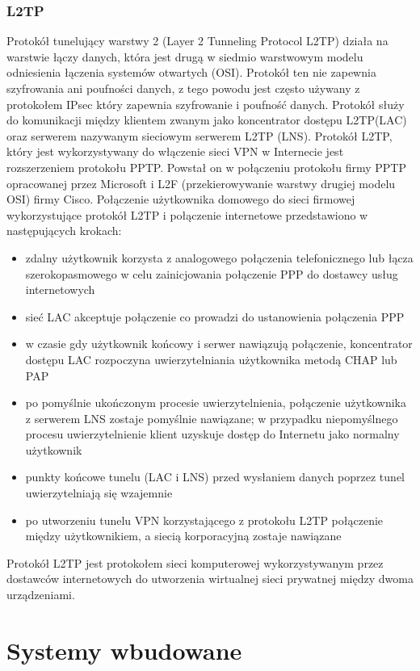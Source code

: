 \documentclass[12p]{article}
\begin{document}
\subsubsection{L2TP}
\quad Protokół tunelujący warstwy 2 (Layer 2 Tunneling Protocol L2TP) działa na warstwie łączy danych, która jest drugą w siedmio warstwowym modelu odniesienia łączenia systemów otwartych (OSI). Protokół ten nie zapewnia szyfrowania ani poufności danych, z tego powodu jest często używany z protokołem IPsec który zapewnia szyfrowanie i poufność danych. Protokół służy do komunikacji między klientem zwanym jako koncentrator dostępu L2TP(LAC) oraz serwerem nazywanym sieciowym serwerem L2TP (LNS). 
Protokół L2TP, który jest wykorzystywany do włączenie sieci VPN w Internecie jest rozszerzeniem protokołu PPTP. Powstał on w połączeniu protokołu firmy PPTP opracowanej przez Microsoft i L2F (przekierowywanie warstwy drugiej modelu OSI) firmy Cisco. Połączenie użytkownika domowego do sieci firmowej wykorzystujące protokół L2TP i połączenie internetowe przedstawiono w następujących krokach:
\begin{itemize}
\item zdalny użytkownik korzysta z analogowego połączenia telefonicznego lub łącza szerokopasmowego w celu zainicjowania połączenie PPP do dostawcy usług internetowych
\item sieć LAC akceptuje połączenie co prowadzi do ustanowienia połączenia PPP
\item w czasie gdy użytkownik końcowy i serwer nawiązują połączenie, koncentrator dostępu LAC rozpoczyna uwierzytelniania użytkownika metodą CHAP lub PAP
\item po pomyślnie ukończonym procesie uwierzytelnienia, połączenie użytkownika z serwerem LNS zostaje pomyślnie nawiązane; w przypadku niepomyślnego procesu uwierzytelnienie klient uzyskuje dostęp do Internetu jako normalny użytkownik
\item punkty końcowe tunelu (LAC i LNS) przed wysłaniem danych poprzez tunel uwierzytelniają się wzajemnie
\item po utworzeniu tunelu VPN korzystającego z protokołu L2TP połączenie między użytkownikiem, a siecią korporacyjną zostaje nawiązane 
\end{itemize}
Protokół L2TP jest protokołem sieci komputerowej wykorzystywanym przez dostawców internetowych do utworzenia wirtualnej sieci prywatnej między dwoma urządzeniami.~\cite{L2TP}

\newpage
\section{Systemy wbudowane}
\end{document}
